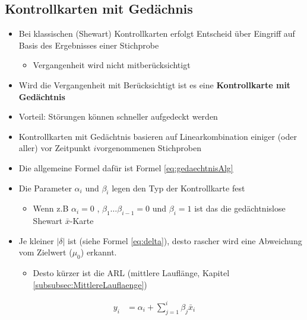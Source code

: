 \subsection{Kontrollkarten mit Gedächnis}
\begin{itemize}
	\item Bei klassischen (Shewart) Kontrollkarten erfolgt Entscheid über Eingriff auf Basis des Ergebnisses einer Stichprobe
	\begin{itemize}
		\item Vergangenheit wird nicht mitberücksichtigt
	\end{itemize}
	\item Wird die Vergangenheit mit Berücksichtigt ist es eine \textbf{Kontrollkarte mit Gedächtnis}
	\item Vorteil: Störungen können schneller aufgedeckt werden
	\item Kontrollkarten mit Gedächtnis basieren auf Linearkombination einiger (oder aller)  vor Zeitpunkt $i$vorgenommenen Stichproben
	\item Die allgemeine Formel dafür ist Formel \ref{eq:gedaechtnisAlg}
	\item Die Parameter $\alpha_i$ und $\beta_i$ legen den Typ der Kontrollkarte fest
	\begin{itemize}
		\item Wenn z.B $\alpha_i = 0$ , $\beta_1\ldots\beta_{i-1} = 0$ und $\beta_i=1$ ist das die gedächtnislose Shewart $\bar{x}$-Karte
	\end{itemize}
	\item Je kleiner $\left\vert \delta\right\rvert$ ist (siehe Formel \ref{eq:delta}), desto rascher wird eine Abweichung vom Zielwert ($\mu_0$) erkannt.
	\begin{itemize}
		\item Desto kürzer ist die ARL (mittlere Lauflänge, Kapitel \ref{subsubsec:MittlereLauflaenge})
	\end{itemize}
\end{itemize}
\begin{align}
	\label{eq:gedaechtnisAlg}
	y_i&= \alpha_i + \sum_{j=1}^{i}\beta_j\bar{x}_i
\end{align}

